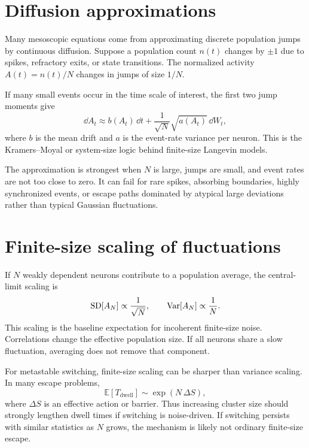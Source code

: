 \section{Diffusion approximations}
\label{sec:diffusion-approximations}

Many mesoscopic equations come from approximating discrete population jumps by continuous diffusion. Suppose a population count $n(t)$ changes by $\pm 1$ due to spikes, refractory exits, or state transitions. The normalized activity $A(t)=n(t)/N$ changes in jumps of size $1/N$.

If many small events occur in the time scale of interest, the first two jump moments give
%
\begin{equation}
  \dd A_t
  \approx b(A_t)\,\dd t
  + \frac{1}{\sqrt{N}}\sqrt{a(A_t)}\,\dd W_t,
  \label{eq:diffusion-approximation}
\end{equation}
%
where $b$ is the mean drift and $a$ is the event-rate variance per neuron. This is the Kramers--Moyal or system-size logic behind finite-size Langevin models.

The approximation is strongest when $N$ is large, jumps are small, and event rates are not too close to zero. It can fail for rare spikes, absorbing boundaries, highly synchronized events, or escape paths dominated by atypical large deviations rather than typical Gaussian fluctuations.

\section{Finite-size scaling of fluctuations}
\label{sec:finite-size-scaling}

If $N$ weakly dependent neurons contribute to a population average, the central-limit scaling is
%
\begin{equation}
  \operatorname{SD}[A_N] \propto \frac{1}{\sqrt{N}},
  \qquad
  \operatorname{Var}[A_N]\propto \frac{1}{N}.
  \label{eq:central-limit-finite-size}
\end{equation}
%
This scaling is the baseline expectation for incoherent finite-size noise. Correlations change the effective population size. If all neurons share a slow fluctuation, averaging does not remove that component.

For metastable switching, finite-size scaling can be sharper than variance scaling. In many escape problems,
%
\begin{equation}
  \mathbb{E}[T_{\mathrm{dwell}}]
  \sim \exp\!\left(N\,\Delta S\right),
  \label{eq:finite-size-dwell-scaling}
\end{equation}
%
where $\Delta S$ is an effective action or barrier. Thus increasing cluster size should strongly lengthen dwell times if switching is noise-driven. If switching persists with similar statistics as $N$ grows, the mechanism is likely not ordinary finite-size escape.

